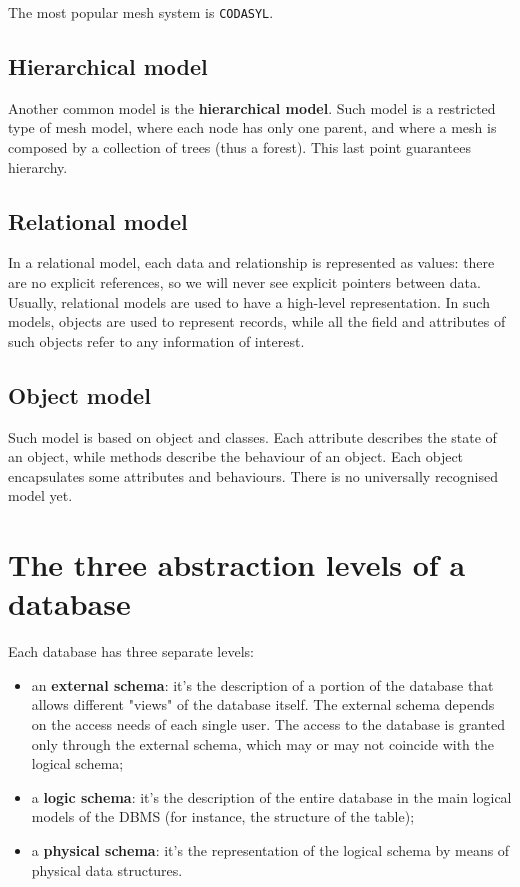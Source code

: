 The most popular mesh system is \texttt{CODASYL}.

\subsection{Hierarchical model}

Another common model is the \textbf{hierarchical model}. Such model is a restricted type of mesh model, where each node has only one parent, and where a mesh is composed by a collection of trees (thus a forest). This last point guarantees hierarchy.

\subsection{Relational model}

In a relational model, each data and relationship is represented as values: there are no explicit references, so we will never see explicit pointers between data. Usually, relational models are used to have a high-level representation. In such models, objects are used to represent records, while all the field and attributes of such objects refer to any information of interest.

\subsection{Object model}

Such model is based on object and classes. Each attribute describes the state of an object, while methods describe the behaviour of an object. Each object encapsulates some attributes and behaviours. There is no universally recognised model yet.

\section{The three abstraction levels of a database}

Each database has three separate levels:
\begin{itemize}
    \item an \textbf{external schema}: it's the description of a portion of the database that allows different "views" of the database itself. The external schema depends on the access needs of each single user. The access to the database is granted only through the external schema, which may or may not coincide with the logical schema;
    \item a \textbf{logic schema}: it's the description of the entire database in the main logical models of the DBMS (for instance, the structure of the table);
    \item a \textbf{physical schema}: it's the representation of the logical schema by means of physical data structures.
\end{itemize}

